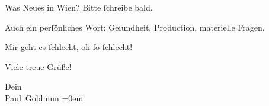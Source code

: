 \pstart
           Was Neues in Wien? Bitte{ }ſchreibe bald.\pend
           
\pstart
           Auch ein perſönliches Wort: Geſundheit, Production, materielle Fragen.\pend
           
\pstart
           Mir geht es{ }ſchlecht, oh{ }ſo{ }ſchlecht!\pend
           
\pstart
           Viele treue Grüße!\pend
           
\pstart
           Dein {\\[\baselineskip]}\spacefill\mbox{Paul Goldmnn}\pend
           \leftskip=0em{}\endnumbering{}  \newcommand{\dateiname}{L02719}\newcommand{\titel}{Paul Goldmann an Arthur Schnitzler, 4. 11. [1893]}\newcommand{\editorInnen}{Martin Anton Müller und Laura Untner}

